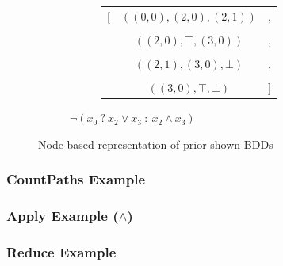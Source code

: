 \documentclass[english, aspectratio=169]{beamer}
\begin{document}
\begin{frame}
\begin{figure}
\begin{subfigure}{0.49\linewidth}
      \begin{subfigure}[b]{0.33\linewidth}
        \centering
        \begin{tikzpicture}[scale=0.6, every node/.style={transform shape}]
          
        \end{tikzpicture}
      \end{subfigure}
      \begin{subfigure}[b]{0.55\linewidth}
        \centering
        { \tiny
          \begin{tabular}{r c l}
            [ & $((0,0), (2,0), (2,1))$ & ,
            \\ \\
              & $((2,0), \top, (3,0))$ & ,
            \\ \\
              & $((2,1), (3,0), \bot)$   & ,
            \\ \\
              & $((3,0), \top, \bot)$   & ]
          \end{tabular}
          \vspace{10pt}
        }
      \end{subfigure}

      \caption{$\neg (x_0 \ ?\ x_2 \vee x_3 \ :\ x_2 \wedge x_3)$}
    \end{subfigure}

    \caption{Node-based representation of prior shown BDDs}
  \end{figure}

\end{frame}

\begin{frame}
  \frametitle{CountPaths Example}

  
\end{frame}

\begin{frame}
  \frametitle{Apply Example ($\wedge$)}

  
\end{frame}

\begin{frame}
  \frametitle{Reduce Example}

    
\end{frame}

\blankframe

\begin{frame}
  
\end{frame}
\end{document}
